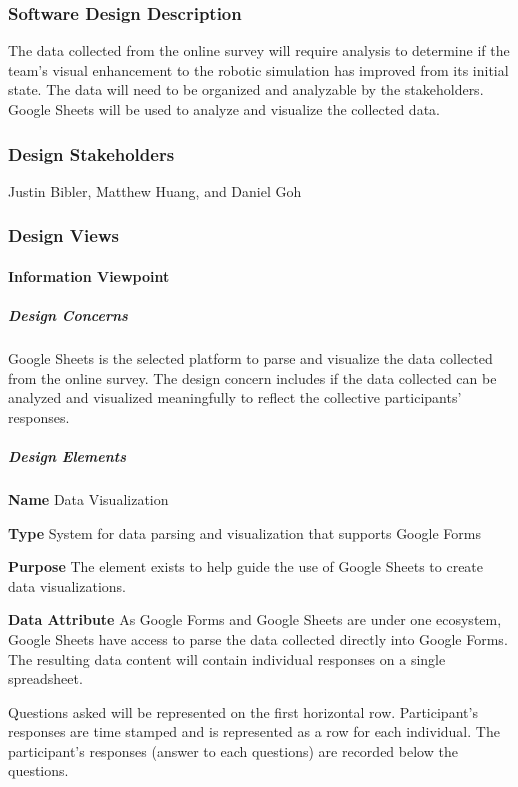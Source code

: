 \begin{flushleft}
\normalsize
\subsubsection{Software Design Description}
The data collected from the online survey will require analysis to determine if the team's visual enhancement to the robotic simulation has improved from its initial state.
The data will need to be organized and analyzable by the stakeholders.
Google Sheets will be used to analyze and visualize the collected data.

\subsubsection{Design Stakeholders}
Justin Bibler, Matthew Huang, and Daniel Goh

\subsubsection{Design Views}
\paragraph{Information Viewpoint}
\subparagraph{Design Concerns}
Google Sheets \cite{googlesheets} is the selected platform to parse and visualize the data collected from the online survey. 
The design concern includes if the data collected can be analyzed and visualized meaningfully to reflect the collective participants' responses.
\vspace{3mm}

\subparagraph{Design Elements}
\textbf{Name}
Data Visualization

\textbf{Type}
System for data parsing and visualization that supports Google Forms 

\textbf{Purpose}
The element exists to help guide the use of Google Sheets to create data visualizations.

\textbf{Data Attribute}
As Google Forms and Google Sheets are under one ecosystem, Google Sheets have access to parse the data collected directly into Google Forms. 
The resulting data content will contain individual responses on a single spreadsheet. 

Questions asked will be represented on the first horizontal row. 
Participant's responses are time stamped and is represented as a row for each individual. 
The participant's responses (answer to each questions) are recorded below the questions. 


\end{flushleft}
